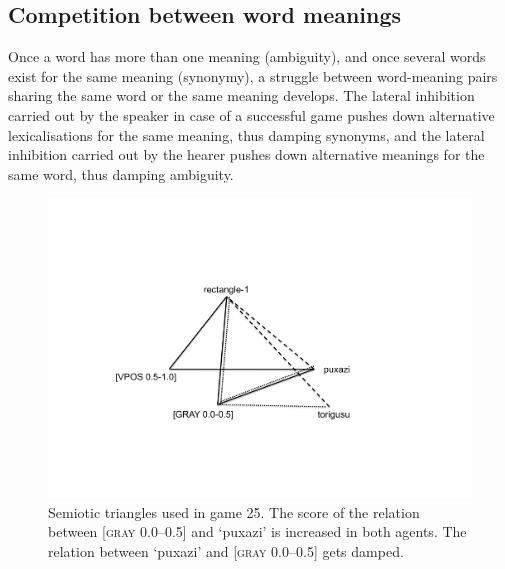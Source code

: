 \subsection{Competition between word meanings }

Once a word has more than one meaning (ambiguity), 
and once several words exist for the same meaning 
(synonymy), a struggle between word-meaning
pairs sharing the same word or the 
same meaning develops. The lateral inhibition carried out by the 
speaker in case of a successful game pushes
down alternative lexicalisations for the same meaning, 
thus damping synonyms, and the lateral inhibition carried out 
by the hearer pushes down alternative meanings for the 
same word, thus damping ambiguity. 


\begin{figure}[t]
  \centerline{\includegraphics[width=.60\textwidth]{chap6/figs/triangle5.pdf}}
\caption{\label{triangle5}Semiotic triangles used 
in game 25. The score of the relation between [\textsc{gray} 0.0–0.5] and 
`puxazi' is increased in both agents. The relation between `puxazi' and 
{}[\textsc{gray} 0.0–0.5] gets damped.}
\end{figure}

